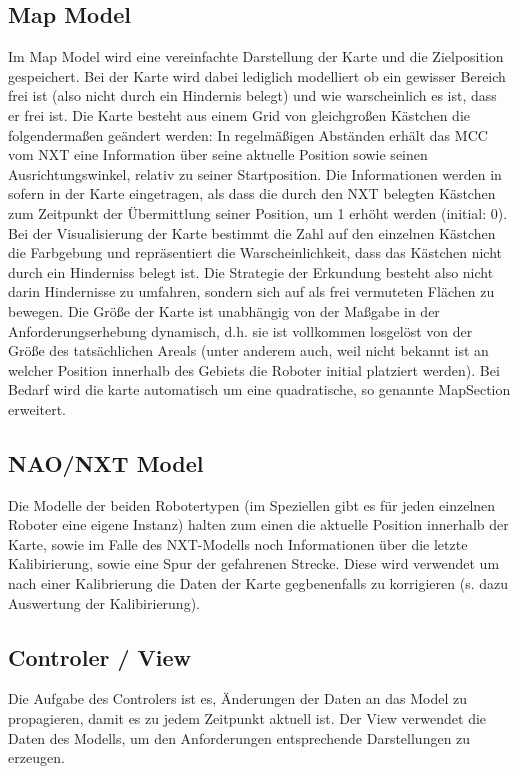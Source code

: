 \subsection{Map Model}
Im Map Model wird eine vereinfachte Darstellung der Karte und die Zielposition gespeichert. Bei der Karte wird dabei lediglich modelliert ob ein gewisser Bereich frei ist (also nicht durch ein Hindernis belegt) und wie warscheinlich es ist, dass er frei ist. Die Karte besteht aus einem Grid von gleichgroßen Kästchen die folgendermaßen geändert werden: In regelmäßigen Abständen erhält das MCC vom NXT eine Information über seine aktuelle Position sowie seinen Ausrichtungswinkel, relativ zu seiner Startposition. Die Informationen werden in sofern in der Karte eingetragen, als dass die durch den NXT belegten Kästchen zum Zeitpunkt der Übermittlung seiner Position, um 1 erhöht werden (initial: 0). Bei der Visualisierung der Karte bestimmt die Zahl auf den einzelnen Kästchen die Farbgebung und repräsentiert die Warscheinlichkeit, dass das Kästchen nicht durch ein Hinderniss belegt ist. Die Strategie der Erkundung besteht also nicht darin Hindernisse zu umfahren, sondern sich auf als frei vermuteten Flächen zu bewegen. Die Größe der Karte ist unabhängig von der Maßgabe in der Anforderungserhebung dynamisch, d.h. sie ist vollkommen losgelöst von der Größe des tatsächlichen Areals (unter anderem auch, weil nicht bekannt ist an welcher Position innerhalb des Gebiets die Roboter initial platziert werden). Bei Bedarf wird die karte automatisch um eine quadratische, so genannte MapSection erweitert.

\subsection{NAO/NXT Model}
Die Modelle der beiden Robotertypen (im Speziellen gibt es für jeden einzelnen Roboter eine eigene Instanz) halten zum einen die aktuelle Position innerhalb der Karte, sowie im Falle des NXT-Modells noch Informationen über die letzte Kalibirierung, sowie eine Spur der gefahrenen Strecke. Diese wird verwendet um nach einer Kalibrierung die Daten der Karte gegbenenfalls zu korrigieren (s. dazu Auswertung der Kalibirierung).

\subsection{Controler / View}
Die Aufgabe des Controlers ist es, Änderungen der Daten an das Model zu propagieren, damit es zu jedem Zeitpunkt aktuell ist. Der View verwendet die Daten des Modells, um den Anforderungen entsprechende Darstellungen zu erzeugen.


